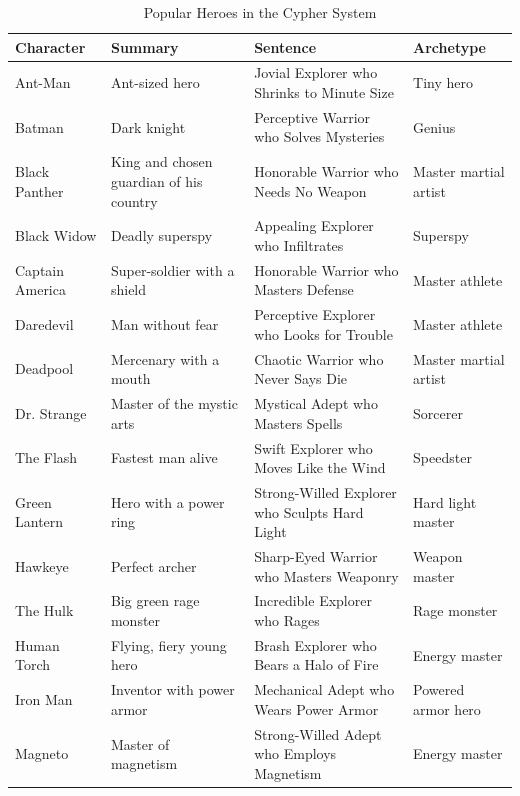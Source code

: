 \begin{table} 

\centering

\caption{Popular Heroes in the Cypher System}
\label{lab:Popular Heroes in the Cypher System}

\begin{tabularx}{\textwidth}{ | Y | Y | Y | Y |}

\hline
\textbf{Character} & \textbf{Summary} & \textbf{Sentence} & \textbf{Archetype} \\ \hline

Ant-Man & Ant-sized hero & Jovial Explorer who Shrinks to Minute Size & Tiny hero \\ \hline
Batman & Dark knight & Perceptive Warrior who Solves Mysteries & Genius \\ \hline
Black Panther & King and chosen guardian of his country & Honorable Warrior who Needs No Weapon & Master martial artist  \\ \hline
Black Widow & Deadly superspy & Appealing Explorer who Infiltrates & Superspy  \\ \hline
Captain America & Super-soldier with a shield & Honorable Warrior who Masters Defense & Master athlete  \\ \hline
Daredevil & Man without fear & Perceptive Explorer who Looks for Trouble & Master athlete  \\ \hline
Deadpool & Mercenary with a mouth & Chaotic Warrior who Never Says Die & Master martial artist  \\ \hline
Dr. Strange & Master of the mystic arts & Mystical Adept who Masters Spells & Sorcerer  \\ \hline
The Flash & Fastest man alive & Swift Explorer who Moves Like the Wind & Speedster  \\ \hline
Green Lantern & Hero with a power ring & Strong-Willed Explorer who Sculpts Hard Light & Hard light master  \\ \hline
Hawkeye & Perfect archer & Sharp-Eyed Warrior who Masters Weaponry & Weapon master  \\ \hline
The Hulk & Big green rage monster & Incredible Explorer who Rages & Rage monster  \\ \hline
Human Torch & Flying, fiery young hero & Brash Explorer who Bears a Halo of Fire & Energy master  \\ \hline
Iron Man & Inventor with power armor & Mechanical Adept who Wears Power Armor & Powered armor hero  \\ \hline
Magneto & Master of magnetism & Strong-Willed Adept who Employs Magnetism & Energy master  \\ \hline

\end{tabularx}
\end{table}
